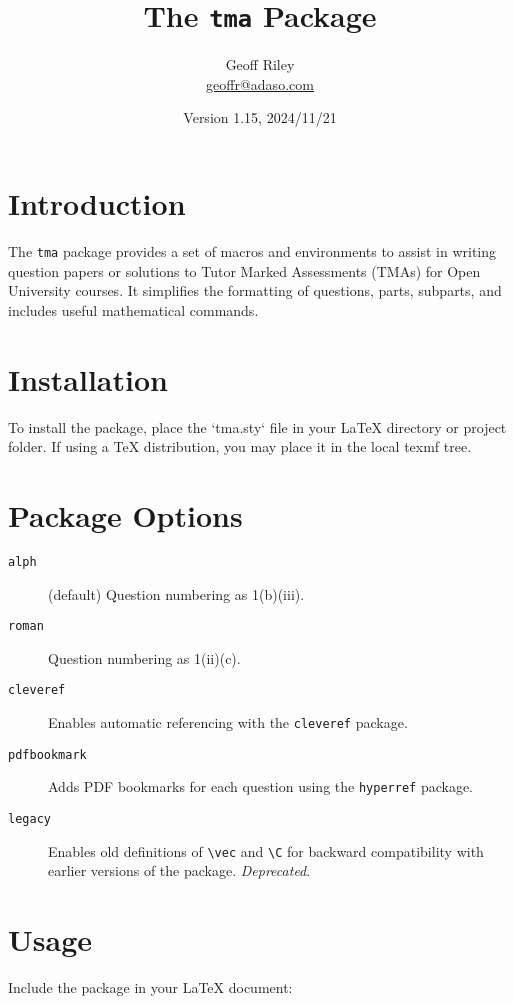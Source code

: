 \documentclass[a4paper,11pt,twoside]{article}
\title{The \texttt{tma} Package}
\author{Geoff Riley \\ \href{mailto:geoffr@adaso.com.com}{geoffr@adaso.com}}
\date{Version 1.15, 2024/11/21}
\begin{document}
	\maketitle

	\tableofcontents

	\section{Introduction}

	The \texttt{tma} package provides a set of macros and environments to assist in writing question papers or solutions to Tutor Marked Assessments (TMAs) for Open University courses. It simplifies the formatting of questions, parts, subparts, and includes useful mathematical commands.

	\section{Installation}

	To install the package, place the `tma.sty` file in your LaTeX directory or project folder. If using a TeX distribution, you may place it in the local texmf tree.

	\section{Package Options}

	\begin{description}
		\item[\texttt{alph}] (default) Question numbering as 1(b)(iii).
		\item[\texttt{roman}] Question numbering as 1(ii)(c).
		\item[\texttt{cleveref}] Enables automatic referencing with the \texttt{cleveref} package.
		\item[\texttt{pdfbookmark}] Adds PDF bookmarks for each question using the \texttt{hyperref} package.
		\item[\texttt{legacy}] Enables old definitions of \verb|\vec| and \verb|\C| for backward compatibility with earlier versions of the package. \emph{Deprecated}.
	\end{description}

	\section{Usage}

	Include the package in your LaTeX document:
\end{document}
